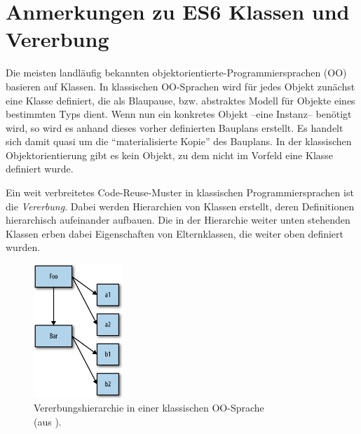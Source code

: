 
\section{Anmerkungen zu ES6 Klassen und Vererbung} \label{keineKlassen}

Die meisten landläufig bekannten objektorientierte-Programmiersprachen (OO) basieren auf Klassen. 
In klassischen
OO-Sprachen wird für jedes Objekt zunächst eine Klasse definiert, die als Blaupause, bzw. abstraktes Modell für Objekte eines bestimmten Typs dient. Wenn nun ein konkretes Objekt --eine Instanz-- benötigt wird, so wird es anhand dieses vorher definierten Bauplans erstellt. Es handelt sich damit quasi um die "`materialisierte Kopie"' des Bauplans. In der klassischen Objektorientierung gibt es kein Objekt, zu dem nicht im Vorfeld eine Klasse definiert wurde. 

Ein weit verbreitetes Code-Reuse-Muster in klassischen Programmiersprachen ist die \emph{Vererbung}. Dabei werden Hierarchien von Klassen erstellt, deren Definitionen hierarchisch aufeinander aufbauen. Die in der Hierarchie weiter unten stehenden Klassen erben dabei Eigenschaften von Elternklassen, die weiter oben definiert wurden.

\begin{figure}[h]
	\centering
	\includegraphics[width=0.3\textwidth]{images/classes_Simpson_p70.png}
	\caption{\label{classes}Vererbungshierarchie in einer klassischen OO-Sprache \\(aus \citep[p. 70]{SimpsonThisobjectprototypes2014}).}
\end{figure}

